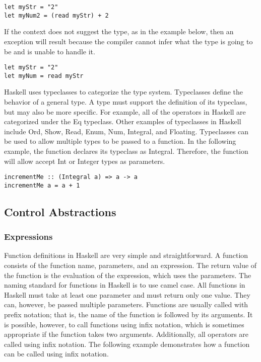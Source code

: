 \documentclass[titlepage,12pt]{article}
\begin{document}
\begin{verbatim}
let myStr = "2" 
let myNum2 = (read myStr) + 2
\end{verbatim}

If the context does not suggest the type, as in the example below, then an exception will result because the compiler cannot infer what the type is going to be and is unable to handle it. 

\begin{verbatim}
let myStr = "2" 
let myNum = read myStr
\end{verbatim}

Haskell uses typeclasses to categorize the type system. Typeclasses define the behavior of a general type. A type must support the definition of its typeclass, but may also be more specific. For example, all of the operators in Haskell are categorized under the Eq typeclass. Other examples of typeclasses in Haskell include Ord, Show, Read, Enum, Num, Integral, and Floating. Typeclasses can be used to allow multiple types to be passed to a function. In the following example, the function declares its typeclass as Integral. Therefore, the function will allow accept Int or Integer types as parameters. 

\begin{verbatim}
incrementMe :: (Integral a) => a -> a
incrementMe a = a + 1
\end{verbatim}


\subsection{Control Abstractions}
\subsubsection{Expressions}

Function definitions in Haskell are very simple and straightforward. A function consists of the function name, parameters, and an expression. The return value of the function is the evaluation of the expression, which uses the parameters. The naming standard for functions in Haskell is to use camel case. All functions in Haskell must take at least one parameter and must return only one value. They can, however, be passed multiple parameters. Functions are usually called with prefix notation; that is, the name of the function is followed by its arguments. It is possible, however, to call functions using infix notation, which is sometimes appropriate if the function takes two arguments. Additionally, all operators are called using infix notation. The following example demonstrates how a function can be called using infix notation. 
\end{document}
